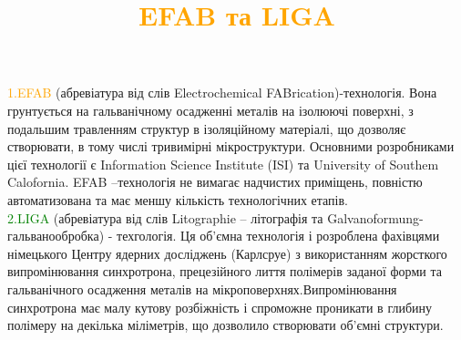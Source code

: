 \documentclass[aspectratio=169]{beamer}
\begin{document}
{
\title{\textcolor{orange}{EFAB та LIGA}}
\begin{frame}
\begin{flushleft}
\textcolor{orange}{\textbf\large 1.EFAB }
	(абревіатура від слів Electrochemical FABrication)-технологія. Вона грунтується на гальванічному осадженні металів на ізолюючі поверхні, з подальшим травленням структур в 		ізоляційному матеріалі, що дозволяє створювати, в тому числі тривимірні мікроструктури. Основними розробниками цієї технології є Information Science Institute (ISI) та University of 	Southem Calofornia. EFAB –технологія не вимагає надчистих приміщень, повністю автоматизована та має меншу кількість технологічних етапів.\\
\textcolor{green}{\textbf\large2.LIGA }
	(абревіатура від слів Litographie – літографія та Galvanoformung- гальванообробка) - техгологія. Ця об’ємна технологія і розроблена фахівцями німецького Центру ядерних 			досліджень (Карлсруе) з використанням жорсткого випромінювання синхротрона, прецезійного лиття полімерів заданої форми та гальванічного осадження металів на 			мікроповерхнях.Випромінювання синхротрона має малу кутову розбіжність і спроможне проникати в глибину полімеру на декілька міліметрів, що дозволило створювати об’ємні 		структури.
\end{flushleft}
\end{frame}
}
\end{document}
